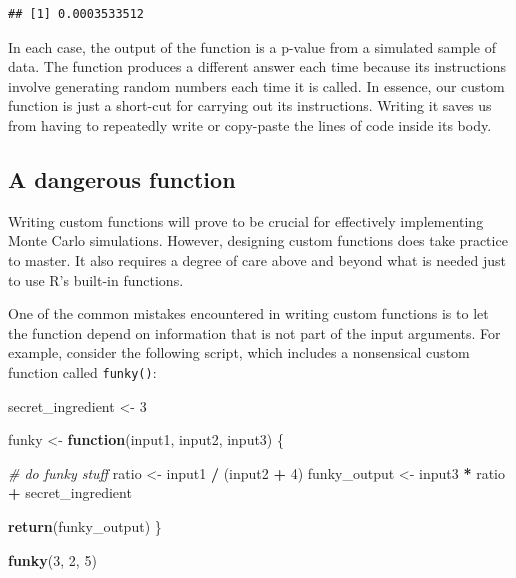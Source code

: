 \documentclass[
]{book}
\newenvironment{Shaded}{\begin{snugshade}}{\end{snugshade}}
\newcommand{\CommentTok}[1]{\textcolor[rgb]{0.56,0.35,0.01}{\textit{#1}}}
\newcommand{\ControlFlowTok}[1]{\textcolor[rgb]{0.13,0.29,0.53}{\textbf{#1}}}
\newcommand{\DecValTok}[1]{\textcolor[rgb]{0.00,0.00,0.81}{#1}}
\newcommand{\FunctionTok}[1]{\textcolor[rgb]{0.13,0.29,0.53}{\textbf{#1}}}
\newcommand{\NormalTok}[1]{#1}
\newcommand{\OtherTok}[1]{\textcolor[rgb]{0.56,0.35,0.01}{#1}}
\newcommand{\SpecialCharTok}[1]{\textcolor[rgb]{0.81,0.36,0.00}{\textbf{#1}}}
\begin{document}
\begin{verbatim}
## [1] 0.0003533512
\end{verbatim}

In each case, the output of the function is a p-value from a simulated sample of data. The function produces a different answer each time because its instructions involve generating random numbers each time it is called.
In essence, our custom function is just a short-cut for carrying out its instructions.
Writing it saves us from having to repeatedly write or copy-paste the lines of code inside its body.

\subsection{A dangerous function}\label{a-dangerous-function}

Writing custom functions will prove to be crucial for effectively implementing Monte Carlo simulations.
However, designing custom functions does take practice to master.
It also requires a degree of care above and beyond what is needed just to use R's built-in functions.

One of the common mistakes encountered in writing custom functions is to let the function depend on information that is not part of the input arguments.
For example, consider the following script, which includes a nonsensical custom function called \texttt{funky()}:

\begin{Shaded}
\begin{Highlighting}[]
\NormalTok{secret\_ingredient }\OtherTok{\textless{}{-}} \DecValTok{3}

\NormalTok{funky }\OtherTok{\textless{}{-}} \ControlFlowTok{function}\NormalTok{(input1, input2, input3) \{}
  
  \CommentTok{\# do funky stuff}
\NormalTok{  ratio }\OtherTok{\textless{}{-}}\NormalTok{ input1 }\SpecialCharTok{/}\NormalTok{ (input2 }\SpecialCharTok{+} \DecValTok{4}\NormalTok{)}
\NormalTok{  funky\_output }\OtherTok{\textless{}{-}}\NormalTok{ input3 }\SpecialCharTok{*}\NormalTok{ ratio }\SpecialCharTok{+}\NormalTok{ secret\_ingredient}
  
  \FunctionTok{return}\NormalTok{(funky\_output)  }
\NormalTok{\}}

\FunctionTok{funky}\NormalTok{(}\DecValTok{3}\NormalTok{, }\DecValTok{2}\NormalTok{, }\DecValTok{5}\NormalTok{)}
\end{Highlighting}
\end{Shaded}
\end{document}
